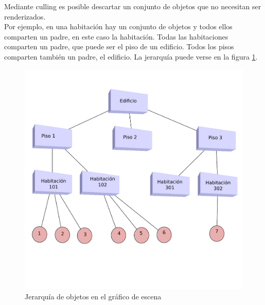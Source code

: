 \documentclass[a4paper,12pt,openany,oneside]{book}
\begin{document}
Mediante culling es posible descartar un conjunto de objetos que no necesitan ser renderizados. 
\\Por ejemplo, en una habitación hay un conjunto de objetos y todos ellos comparten un padre, en este caso la habitación. Todas las habitaciones comparten un padre, que puede ser el piso de un edificio. Todos los pisos comparten también un padre, el edificio. La jerarquía puede verse en la figura \ref{culling1label}.
\begin{figure}[!hbp]
\begin{center}
\includegraphics[scale=0.7]{culling1.pdf}
\caption[Ejemplo Culling 1]{Jerarquía de objetos en el gráfico de escena}\label{culling1label}
\end{center}
\end{figure}
\end{document}
